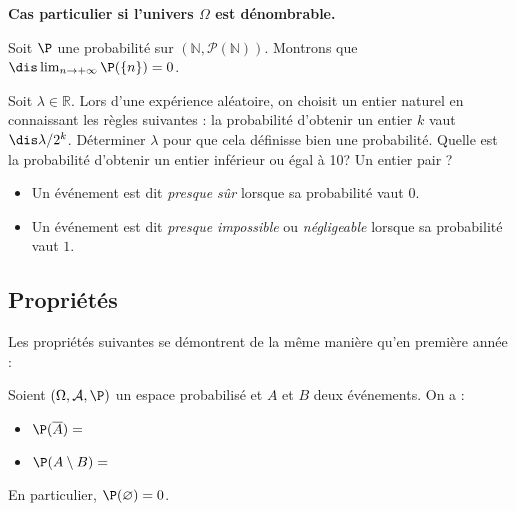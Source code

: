 \documentclass[a4paper,10pt]{report}
\begin{document}
\medskip

\noindent \textbf{Cas particulier si l'univers $\Omega$ est dénombrable.}

\medskip

\vspace{9cm}

\begin{ex} Soit $\P$ une probabilité sur $(\mathbb{N}, \mathcal{P}(\mathbb{N}))$. Montrons que $\dis \lim_{n \rightarrow + \infty} \P( \lbrace n \rbrace )= 0$.
 \newpage
\end{ex}
\begin{exa}
Soit $\lambda \in \mathbb{R}$. Lors d'une expérience aléatoire, on choisit un entier naturel en connaissant les règles suivantes : la probabilité d'obtenir un entier $k$ vaut $ \dis \lambda/2^k$. Déterminer $\lambda$ pour que cela définisse bien une probabilité. Quelle est la probabilité d'obtenir un entier inférieur ou égal à 10? Un entier pair ?
\end{exa}

\begin{defin}
\begin{itemize}
\item Un événement est dit \textit{presque sûr} lorsque sa probabilité vaut $0$.
\item Un événement est dit \textit{presque impossible} ou \textit{négligeable} lorsque sa probabilité vaut $1$.
\end{itemize}
\end{defin}


 




\subsection{Propriétés}
\noindent Les propriétés suivantes se démontrent de la même manière qu'en première année : 

\begin{prop}\label{Prop1}
Soient $(\Omega, \mathcal{A}, \P)$ un espace probabilisé et $A$ et $B$ deux événements. On a :
\begin{itemize}
\item $\P(\overline{A})=$\phantom{$1-P(A)$.}
\item $\P(A \setminus B) =$\phantom{$\P(A)-P(A \cap B)$.}
\end{itemize}
\end{prop}

\begin{rem}
 En particulier, $\P(\varnothing)= 0$.
\end{rem}
\end{document}
